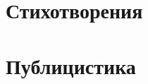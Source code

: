 \documentclass[12pt]{book}
\begin{document}
%

\tableofcontents
%

\chapter{Стихотворения}


\chapter{Публицистика}


%



\end{document}
